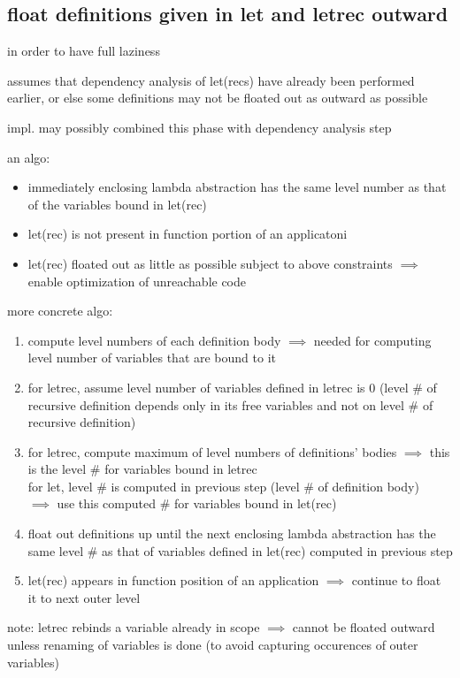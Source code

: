 \documentclass[8pt]{extarticle}
\begin{document}
\begin{multicols*}{2}
\begin{tblr}[]{}
\subsection{float definitions given in let and letrec outward}

in order to have full laziness

assumes that dependency analysis of let(recs) have already been performed earlier, or else some definitions may not be floated out as outward as possible

impl. may possibly combined this phase with dependency analysis step

an algo:
\begin{itemize}
\item immediately enclosing lambda abstraction has the same level number as that of the variables bound in let(rec)
\item let(rec) is not present in function portion of an applicatoni
\item let(rec) floated out as little as possible subject to above constraints $\implies$ enable optimization of unreachable code
\end{itemize}

more concrete algo:
\begin{enumerate}
\item compute level numbers of each definition body $\implies$ needed for computing level number of variables that are bound to it
\item for letrec, assume level number of variables defined in letrec is 0 (level \# of recursive definition depends only in its free variables and not on level \# of recursive definition)
\item for letrec, compute maximum of level numbers of definitions' bodies $\implies$ this is the level \# for variables bound in letrec\\
  for let, level \# is computed in previous step (level \# of definition body)\\
  $\implies$ use this computed \# for variables bound in let(rec)
\item float out definitions up until the next enclosing lambda abstraction has the same level \# as that of variables defined in let(rec) computed in previous step
\item let(rec) appears in function position of an application $\implies$ continue to float it to next outer level
\end{enumerate}

note: letrec rebinds a variable already in scope $\implies$ cannot be floated outward unless renaming of variables is done (to avoid capturing occurences of outer variables)


\end{tblr}
\end{multicols*}
\end{document}
